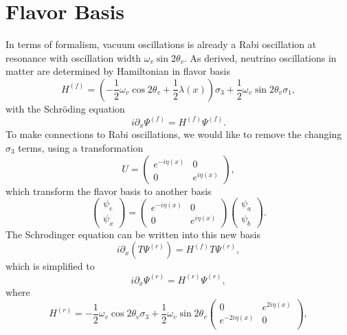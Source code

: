 \section{Flavor Basis}

In terms of formalism, vacuum oscillations is already a Rabi oscillation at resonance with oscillation width $\omega_v \sin 2\theta_v$. As derived, neutrino oscillations in matter are determined by Hamiltonian in flavor basis
\begin{equation}
      H^{(f)} = \left(- \frac{1}{2} \omega_v \cos 2\theta_v +\frac{1}{2}\lambda(x)  \right)\sigma_3 + \frac{1}{2} \omega_v \sin 2\theta_v \sigma_1,
\end{equation}
with the Schr\"{o}ding equation
\begin{equation}
    i \partial_x \Psi^{(f)} = H^{(f)} \Psi^{(f)}.
\end{equation}
To make connections to Rabi oscillations, we would like to remove the changing $\sigma_3$ terms, using a transformation
\begin{equation}
    U = \begin{pmatrix} e^{-i \eta (x)} & 0 \\  0 & e^{i \eta (x)}  \end{pmatrix},
\end{equation}
which transform the flavor basis to another basis
\begin{equation}
    \begin{pmatrix} \psi_e \\ \psi_x \end{pmatrix} = \begin{pmatrix} e^{-i \eta (x)} & 0 \\  0 & e^{i \eta (x)}  \end{pmatrix} \begin{pmatrix} \psi_{a} \\ \psi_{b} \end{pmatrix}.
\end{equation}
The Schrodinger equation can be written into this new basis
\begin{equation}
    i \partial_x (T \Psi^{(r)}) = H^{(f)} T\Psi^{(r)},
\end{equation}
which is simplified to
\begin{equation}
    i \partial_x \Psi^{(r)} = H^{(r)} \Psi^{(r)},
\end{equation}
where
\begin{equation}
 H^{(r)} = - \frac{1}{2}\omega_v \cos 2\theta_v \sigma_3 + \frac{1}{2} \omega_v \sin 2\theta_v \begin{pmatrix}
   0 & e^{2i\eta(x)} \\
   e^{-2i\eta(x)} & 0 \\
   \end{pmatrix},
\end{equation}
